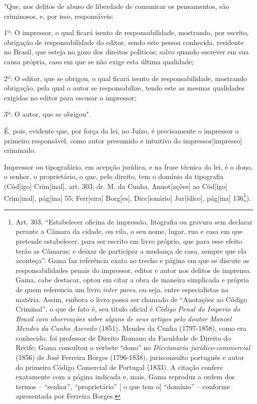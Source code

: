 "Que, nos delitos de abuso de liberdade de comunicar os pensamentos, são
criminosos, e, por isso, responsáveis:

1º: O impressor, o qual ficará isento de responsabilidade, mostrando,
por escrito, obrigação de responsabilidade do editor, sendo este pessoa
conhecida, residente no Brasil, que esteja no gozo dos direitos
políticos; salvo quando escrever em sua causa própria, caso em que se
não exige esta última qualidade;

2º: O editor, que se obrigou, o qual ficará isento de responsabilidade,
mostrando obrigação, pela qual o autor se responsabilize, tendo este as
mesmas qualidades exigidas no editor para escusar o impressor;

3º: O autor, que se obrigou".

É, pois, evidente que, por força da lei, no Juízo, é precisamente o
impressor o primeiro responsável, como autor presumido e intuitivo do
impressor{[}impresso{]} criminado.

Impressor ou tipografário, em acepção jurídica, e na frase técnica da
lei, é o dono, o senhor, o proprietário, o que, pelo direito, tem o
domínio da tipografia (Cód{[}igo{]} Crim{[}inal{]}, art. 303; dr. M. da
Cunha, Annot{[}ações{]} ao Cód{[}igo{]} Crim{[}inal{]}, pág{[}ina{]} 55;
Ferr{[}eira{]} Borg{[}es{]}, Dicc{[}ionário{]} Jur{[}ídico{]},
pág{[}ina{]} 136\footnote{Art. 303. ``Estabelecer oficina de impressão,
  litografia ou gravura sem declarar perante a Câmara da cidade, ou
  vila, o seu nome, lugar, rua e casa em que pretende estabelecer, para
  ser escrito em livro próprio, que para esse efeito terão as Câmaras; e
  deixar de participar a mudança de casa, sempre que ela aconteça''.
  Gama faz referência exata ao trecho e página em que se discute as
  responsabilidades penais do impressor, editor e autor nos delitos de
  imprensa. Gama, cabe destacar, optou em citar a obra de maneira
  simplicada e própria de quem referencia um livro \emph{inter pares},
  ou seja, entre especialistas na matéria. Assim, embora o livro possa
  ser chamado de ``Anotações ao Código Criminal'', o que de fato é, seu
  título oficial é \emph{Código Penal do Imperio do Brazil com
  observações sobre alguns de seus artigos pelo doutor Manoel Mendes da
  Cunha Azevedo} (1851). Mendes da Cunha (1797-1858), como era
  conhecido, foi professor de Direito Romano da Faculdade de Direito do
  Recife; Gama consultou o verbete ``dono'' no \emph{Diccionario
  juridico-commercial} (1856) de José Ferreira Borges (1796-1838),
  jurisconsulto português e autor do primeiro Código Comercial de
  Portugal (1833). A citação confere exatamente com a página indicada e,
  mais, Gama reproduz a ordem dos termos -- ``senhor'', ``proprietário''
  {[} o que tem o{]} ``domínio'' -- conforme apresentada por Ferreira
  Borges.}).

